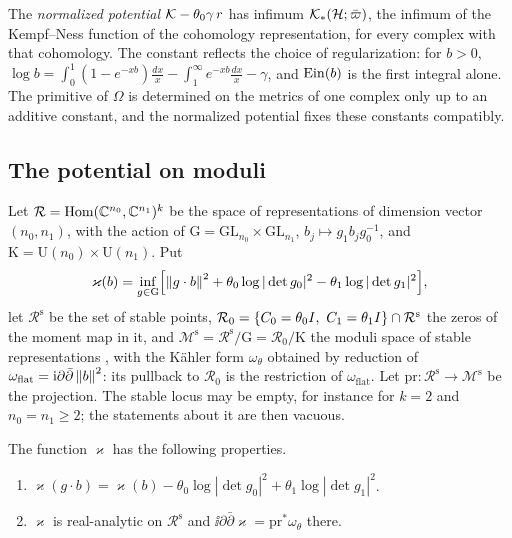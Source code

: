 \begin{remark}\label{rem:normalization}
The \emph{normalized potential} $\mathcal K-\theta_0\gamma\,r$ has infimum
$\mathcal K_*(\mathcal H;\bar\varpi)$, the infimum of the Kempf--Ness function of the
cohomology representation, for every complex with that cohomology. The
constant reflects the choice of regularization: for $b>0$,
$\log b=\int_0^1(1-e^{-xb})\frac{dx}x-\int_1^\infty e^{-xb}\frac{dx}x-\gamma$,
and $\operatorname{Ein}(b)$ is the first integral alone. The primitive of $\Omega$
is determined on the metrics of one complex only up to an additive constant,
and the normalized potential fixes these constants compatibly.
\end{remark}

\subsection{The potential on moduli}
Let $\mathcal R=\operatorname{Hom}(\mathbb C^{n_0},\mathbb C^{n_1})^k$ be the space of
representations of dimension vector $(n_0,n_1)$, with the action of
$\mathrm G=\mathrm{GL}_{n_0}\times\mathrm{GL}_{n_1}$,
$b_j\mapsto g_1b_jg_0^{-1}$, and $\mathrm K=\mathrm U(n_0)\times\mathrm U(n_1)$.
Put
\[
 \varkappa(b)=\inf_{g\in\mathrm G}\Bigl[\left\lVert g\cdot b\right\rVert^2+\theta_0\log|\det g_0|^2
 -\theta_1\log|\det g_1|^2\Bigr],
\]
let $\mathcal R^{\mathrm s}$ be the set of stable points,
$\mathcal R_0=\{C_0=\theta_0I,\ C_1=\theta_1I\}\cap\mathcal R^{\mathrm s}$
the zeros of the moment map in it, and
$\mathcal M^{\mathrm s}=\mathcal R^{\mathrm s}/\mathrm G=\mathcal R_0/\mathrm K$
the moduli space of stable representations \cite{kin94}, with the K\"ahler
form $\omega_\theta$ obtained by reduction of
$\omega_{\mathrm{flat}}=\mathrm i\partial\bar\partial\left\lVert b\right\rVert^2$: its pullback to
$\mathcal R_0$ is the restriction of $\omega_{\mathrm{flat}}$. Let
$\mathrm{pr}:\mathcal R^{\mathrm s}\to\mathcal M^{\mathrm s}$ be the
projection. The stable locus may be empty, for instance for $k=2$ and
$n_0=n_1\geq2$; the statements about it are then vacuous.

\begin{lemma}\label{lem:kappa}
The function $\varkappa$ has the following properties.
\begin{enumerate}
\item[(a)] $\varkappa(g\cdot b)=\varkappa(b)-\theta_0\log|\det g_0|^2+\theta_1\log|\det g_1|^2$.
\item[(b)] $\varkappa$ is real-analytic on $\mathcal R^{\mathrm s}$ and
 $\ii\partial\bar\partial\varkappa=\mathrm{pr}^*\omega_\theta$ there.
\end{enumerate}
\end{lemma}

